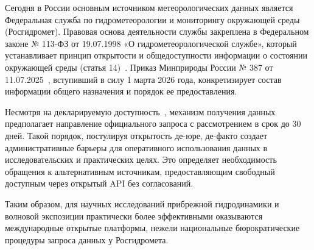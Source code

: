 Сегодня в России основным источником метеорологических данных является Федеральная служба по гидрометеорологии и мониторингу окружающей среды (Росгидромет). 
Правовая основа деятельности службы закреплена в Федеральном законе № 113-ФЗ от 19.07.1998 «О гидрометеорологической службе», который устанавливает принцип открытости и общедоступности информации о состоянии окружающей среды (статья 14)~\cite{rf_fedlaw_113fz_1998}. Приказ Минприроды России № 387 от 11.07.2025~\cite{minprirody_order_387_2025}, вступивший в силу 1 марта 2026 года, конкретизирует состав информации общего назначения и порядок ее предоставления.

Несмотря на декларируемую доступность~\cite{minprirody_order_387_2025}, механизм получения данных предполагает направление официального запроса с рассмотрением в срок до 30 дней.
Такой порядок, постулируя открытость де-юре, де-факто создает административные барьеры для оперативного использования данных в исследовательских и практических целях. 
Это определяет необходимость обращения к альтернативным источникам, предоставляющим свободный доступным через открытый API без согласований.

Таким образом, для научных исследований прибрежной гидродинамики и волновой экспозиции практически более эффективными оказываются международные открытые платформы, нежели национальные бюрократические процедуры запроса данных у Росгидромета.
